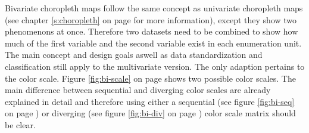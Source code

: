 Bivariate choropleth maps follow the same concept as univariate choropleth maps (see chapter \ref{s:choropleth} on page \pageref{s:choropleth} for more information), except they show two phenomenons at once. Therefore two datasets need to be combined to show how much of the first variable and the second variable exist in each enumeration unit. The main concept and design goals aswell as data standardization and classification still apply to the multivariate version. The only adaption pertains to the color scale. Figure \ref{fig:bi-scale} on page \pageref{fig:bi-scale} shows two possible color scales. The main difference between sequential and diverging color scales are already explained in detail and therefore using either a sequential (see figure \ref{fig:bi-seq} on page \pageref{fig:bi-seq}) or diverging (see figure \ref{fig:bi-div} on page \pageref{fig:bi-div}) color scale matrix should be clear.


